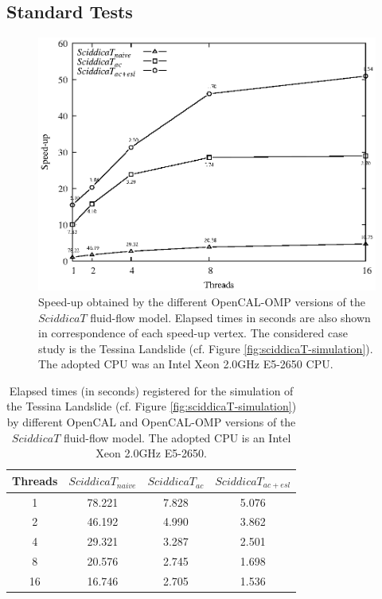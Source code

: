 \subsection{Standard Tests}
\label{sec:standard_tests}
\begin{figure}
	\begin{center}
		\includegraphics[width=1.0\textwidth]{./images/opencal/Figure07_new}
		\caption{Speed-up obtained by the different OpenCAL-OMP
			versions of the $SciddicaT$ fluid-flow model. Elapsed times
			in seconds are also shown in correspondence of each speed-up
			vertex. The considered case study is the Tessina Landslide
			(cf. Figure \ref{fig:sciddicaT-simulation}). The adopted CPU
			was an Intel Xeon 2.0GHz E5-2650 CPU.}
		\label{gr:sciddicaT-OMP-absolute-speed-up}
	\end{center}
\end{figure}

\begin{table}
	\centering
	\begin{tabular}{cccc}
		\hline Threads & $SciddicaT_{naive}$ & $SciddicaT_{ac}$ &
		$SciddicaT_{ac+esl}$ \\ \hline 1 & 78.221 & 7.828 & 5.076\\ 2 &
		46.192 & 4.990 & 3.862\\ 4 & 29.321 & 3.287 & 2.501\\ 8 & 20.576
		& 2.745 & 1.698\\ 16 & 16.746 & 2.705 & 1.536\\ \hline
	\end{tabular}
	\caption{Elapsed times (in seconds) registered for the simulation of the
		Tessina Landslide (cf. Figure \ref{fig:sciddicaT-simulation}) by
		different OpenCAL and OpenCAL-OMP versions of the $SciddicaT$
		fluid-flow model. The adopted CPU is an Intel Xeon 2.0GHz E5-2650.}
	\label{tab:sciddicaT-OMP-execution-times}
\end{table}

